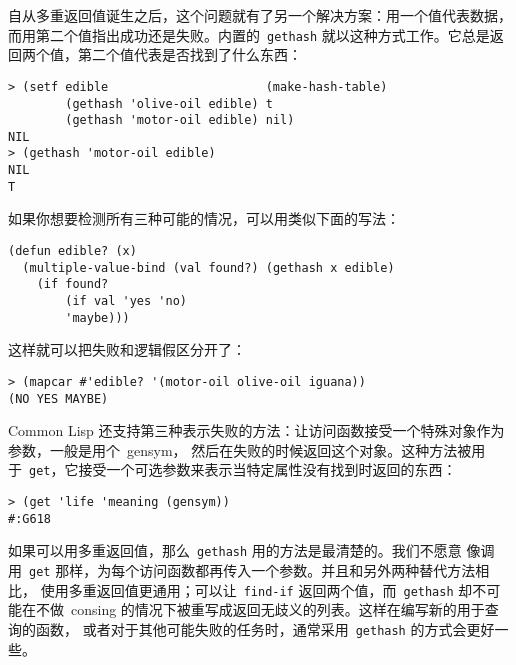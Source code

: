 自从多重返回值诞生之后，这个问题就有了另一个解决方案：用一个值代表数据，而用第二个值指出成功还是失败。内置的~\texttt{gethash} 就以这种方式工作。它总是返回两个值，第二个值代表是否找到了什么东西：
\begin{lstlisting}
> (setf edible                      (make-hash-table)
        (gethash 'olive-oil edible) t
        (gethash 'motor-oil edible) nil)
NIL
> (gethash 'motor-oil edible)
NIL
T
\end{lstlisting}
如果你想要检测所有三种可能的情况，可以用类似下面的写法：
\begin{lstlisting}
(defun edible? (x)
  (multiple-value-bind (val found?) (gethash x edible)
    (if found?
        (if val 'yes 'no)
        'maybe)))
\end{lstlisting}
这样就可以把失败和逻辑假区分开了：
\begin{lstlisting}
> (mapcar #'edible? '(motor-oil olive-oil iguana))
(NO YES MAYBE)
\end{lstlisting}

Common Lisp 还支持第三种表示失败的方法：让访问函数接受一个特殊对象作为参数，一般是用个~gensym，
然后在失败的时候返回这个对象。这种方法被用于~\texttt{get}，它接受一个可选参数来表示当特定属性没有找到时返回的东西：
\begin{lstlisting}
> (get 'life 'meaning (gensym))
#:G618
\end{lstlisting}

如果可以用多重返回值，那么~\texttt{gethash} 用的方法是最清楚的。我们不愿意
像调用~\texttt{get} 那样，为每个访问函数都再传入一个参数。并且和另外两种替代方法相比，
使用多重返回值更通用；可以让~\texttt{find-if} 返回两个值，而~\texttt{gethash}
却不可能在不做~consing 的情况下被重写成返回无歧义的列表。这样在编写新的用于查询的函数，
或者对于其他可能失败的任务时，通常采用~\texttt{gethash} 的方式会更好一些。

